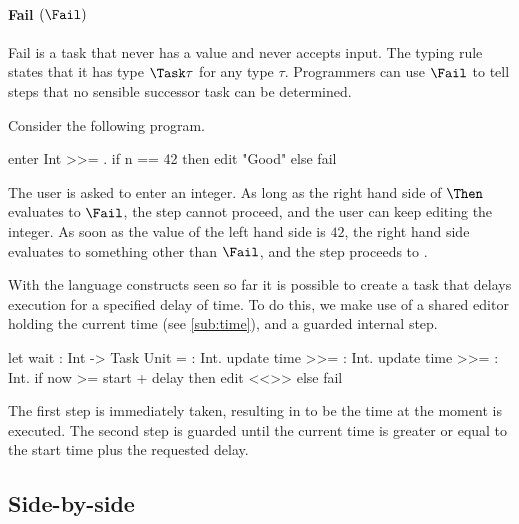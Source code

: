 \paragraph{Fail $(\Fail)$}

Fail is a task that never has a value and never accepts input.
The typing rule  states that it has type $\Task \tau$ for any type $\tau$.
Programmers can use $\Fail$ to tell steps that no sensible successor task can be determined.

\begin{example}

Consider the following program.
\begin{TASK}
  enter Int >>= \n. if n == 42 then edit "Good" else fail
\end{TASK}
The user is asked to enter an integer.
As long as the right hand side of $\Then$ evaluates to $\Fail$, the step cannot proceed, and the user can keep editing the integer.
As soon as the value of the left hand side is $42$, the right hand side evaluates to something other than $\Fail$, and the step proceeds to .

\end{example}



\begin{example}[Waiting]\label{exm:wait}

With the language constructs seen so far it is possible to create a task that delays execution for a specified delay of time.
To do this,
we make use of a shared editor holding the current time (see \autoref{sub:time}),
and a guarded internal step.
\begin{TASK}
  let wait : Int -> Task Unit = \delay : Int.
    update time >>= \start : Int.
    update time >>= \now : Int.
      if now >= start + delay then edit <<>> else fail
\end{TASK}
The first step is immediately taken, resulting in  to be the time at the moment  is executed.
The second step is guarded until the current time is greater or equal to the start time plus the requested delay.

\end{example}



\subsection{Side-by-side}



